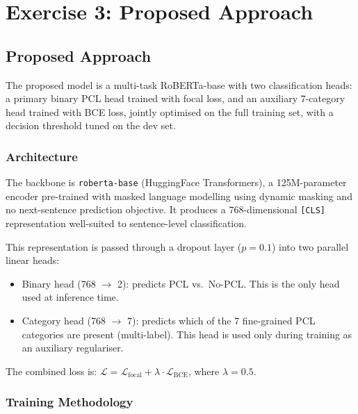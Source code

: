 \documentclass{article}
\begin{document}
\section{Exercise 3: Proposed Approach}

\subsection*{Proposed Approach}

The proposed model is a multi-task RoBERTa-base with two classification heads: a primary binary PCL head trained with focal loss, and an auxiliary 7-category head trained with BCE loss, jointly optimised on the full training set, with a decision threshold tuned on the dev set.

\subsubsection*{Architecture}

The backbone is \texttt{roberta-base} (HuggingFace Transformers), a 125M-parameter encoder pre-trained with masked language modelling using dynamic masking and no next-sentence prediction objective. It produces a 768-dimensional \texttt{[CLS]} representation well-suited to sentence-level classification.

This representation is passed through a dropout layer ($p = 0.1$) into two parallel linear heads:
\begin{itemize}
    \item Binary head (768 $\to$ 2): predicts PCL vs.\ No-PCL. This is the only head used at inference time.
    \item Category head (768 $\to$ 7): predicts which of the 7 fine-grained PCL categories are present (multi-label). This head is used only during training as an auxiliary regulariser.
\end{itemize}

The combined loss is: $\mathcal{L} = \mathcal{L}_{\text{focal}} + \lambda \cdot \mathcal{L}_{\text{BCE}}$, where $\lambda = 0.5$.

\subsubsection*{Training Methodology}
\end{document}
